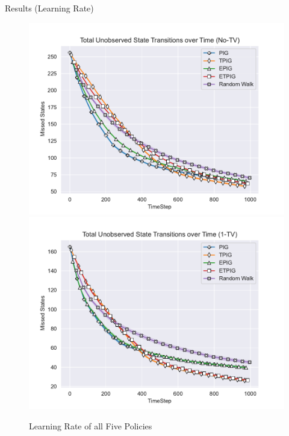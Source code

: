 	\begin{frame}[fragile]{Results (Learning Rate)}
		\begin{figure}
			\begin{center}
				\includegraphics[scale=0.40]{"../images/Missed_States_No-TV.pdf"}
				\includegraphics[scale=0.40]{"../images/Missed_States_1-TV.pdf"}
			\end{center}
			\caption{Learning Rate of all Five Policies}
		\end{figure}
	\end{frame}
	
	
